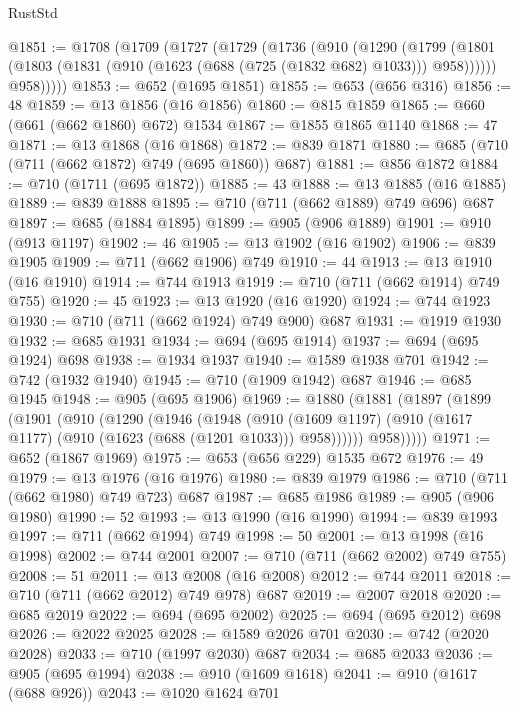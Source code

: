 \begin{lexlean}{RustStd}
\begin{coremodule}
{\begin{coremodule}
{{{{{{{{{{{{{{{{{{{{@1851 := @1708
    (@1709
      (@1727
        (@1729
          (@1736
            (@910
              (@1290
                (@1799
                  (@1801 (@1803 (@1831 (@910 (@1623 (@688 (@725 (@1832 @682) @1033))) @958))))))
              @958)))))
@1853 := @652 (@1695 @1851)
@1855 := @653 (@656 @316)
@1856 := 48
@1859 := @13 @1856 (@16 @1856)
@1860 := @815 @1859
@1865 := @660 (@661 (@662 @1860) @672) @1534
@1867 := @1855 @1865 @1140
@1868 := 47
@1871 := @13 @1868 (@16 @1868)
@1872 := @839 @1871
@1880 := @685 (@710 (@711 (@662 @1872) @749 (@695 @1860)) @687)
@1881 := @856 @1872
@1884 := @710 (@1711 (@695 @1872))
@1885 := 43
@1888 := @13 @1885 (@16 @1885)
@1889 := @839 @1888
@1895 := @710 (@711 (@662 @1889) @749 @696) @687
@1897 := @685 (@1884 @1895)
@1899 := @905 (@906 @1889)
@1901 := @910 (@913 @1197)
@1902 := 46
@1905 := @13 @1902 (@16 @1902)
@1906 := @839 @1905
@1909 := @711 (@662 @1906) @749
@1910 := 44
@1913 := @13 @1910 (@16 @1910)
@1914 := @744 @1913
@1919 := @710 (@711 (@662 @1914) @749 @755)
@1920 := 45
@1923 := @13 @1920 (@16 @1920)
@1924 := @744 @1923
@1930 := @710 (@711 (@662 @1924) @749 @900) @687
@1931 := @1919 @1930
@1932 := @685 @1931
@1934 := @694 (@695 @1914)
@1937 := @694 (@695 @1924) @698
@1938 := @1934 @1937
@1940 := @1589 @1938 @701
@1942 := @742 (@1932 @1940)
@1945 := @710 (@1909 @1942) @687
@1946 := @685 @1945
@1948 := @905 (@695 @1906)
@1969 := @1880
    (@1881
      (@1897
        (@1899
          (@1901
            (@910
              (@1290
                (@1946
                  (@1948
                    (@910
                      (@1609 @1197)
                      (@910 (@1617 @1177) (@910 (@1623 (@688 (@1201 @1033))) @958))))))
              @958)))))
@1971 := @652 (@1867 @1969)
@1975 := @653 (@656 @229) @1535 @672
@1976 := 49
@1979 := @13 @1976 (@16 @1976)
@1980 := @839 @1979
@1986 := @710 (@711 (@662 @1980) @749 @723) @687
@1987 := @685 @1986
@1989 := @905 (@906 @1980)
@1990 := 52
@1993 := @13 @1990 (@16 @1990)
@1994 := @839 @1993
@1997 := @711 (@662 @1994) @749
@1998 := 50
@2001 := @13 @1998 (@16 @1998)
@2002 := @744 @2001
@2007 := @710 (@711 (@662 @2002) @749 @755)
@2008 := 51
@2011 := @13 @2008 (@16 @2008)
@2012 := @744 @2011
@2018 := @710 (@711 (@662 @2012) @749 @978) @687
@2019 := @2007 @2018
@2020 := @685 @2019
@2022 := @694 (@695 @2002)
@2025 := @694 (@695 @2012) @698
@2026 := @2022 @2025
@2028 := @1589 @2026 @701
@2030 := @742 (@2020 @2028)
@2033 := @710 (@1997 @2030) @687
@2034 := @685 @2033
@2036 := @905 (@695 @1994)
@2038 := @910 (@1609 @1618)
@2041 := @910 (@1617 (@688 @926))
@2043 := @1020 @1624 @701
}}}}}}}}}}}}}}}}}}}}
\end{coremodule}}
\end{coremodule}
\end{lexlean}
